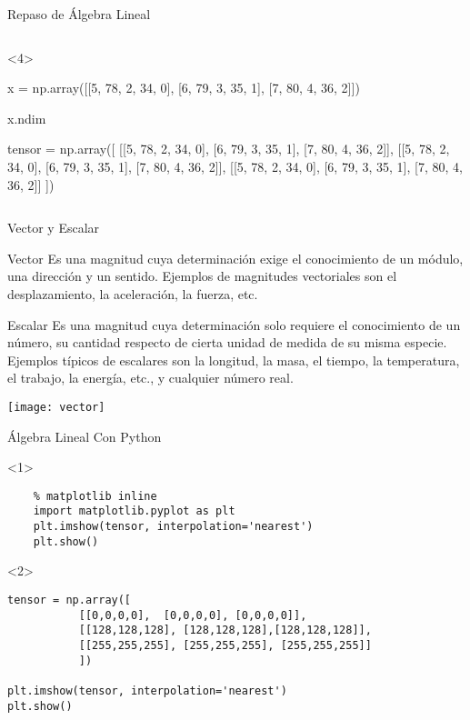 \begin{frame}[fragile]{Repaso de Álgebra Lineal}
\begin{columns}[t]
  \begin{onlyenv}<4>
    \begin{ipythonnb}
x = np.array([[5, 78, 2, 34, 0],
              [6, 79, 3, 35, 1],
              [7, 80, 4, 36, 2]])

x.ndim
\end{ipythonnb}

      \begin{ipythonnb}
        tensor = np.array([
        [[5, 78, 2, 34, 0],
         [6, 79, 3, 35, 1],
         [7, 80, 4, 36, 2]],
        [[5, 78, 2, 34, 0],
         [6, 79, 3, 35, 1],
         [7, 80, 4, 36, 2]],
        [[5, 78, 2, 34, 0],
         [6, 79, 3, 35, 1],
         [7, 80, 4, 36, 2]]
        ])
\end{ipythonnb}
\end{onlyenv}

  \end{columns}
\end{frame}

\begin{frame}{Vector y Escalar}
  \begin{block}{Vector} \justifying
    Es una magnitud cuya determinación exige el conocimiento de un módulo, una dirección y un sentido. Ejemplos de magnitudes vectoriales son el desplazamiento, la aceleración, la fuerza, etc.
  \end{block}
  \begin{block}{Escalar} \justifying
    Es una magnitud cuya determinación solo requiere el conocimiento de un número, su cantidad respecto de cierta unidad de medida de su misma especie. Ejemplos típicos de escalares son la longitud, la masa, el tiempo, la temperatura, el trabajo, la energía, etc., y cualquier número real.
  \end{block}

  {\centering
    \texttt{[image: vector]}
  \par}
\end{frame}

\begin{frame}[fragile]{Álgebra Lineal Con Python}
  \begin{onlyenv}<1>
      \begin{lstlisting}
    % matplotlib inline
    import matplotlib.pyplot as plt
    plt.imshow(tensor, interpolation='nearest')
    plt.show()
  \end{lstlisting}
\end{onlyenv}

\begin{onlyenv}<2>
  \begin{lstlisting}
tensor = np.array([
		   [[0,0,0,0],  [0,0,0,0], [0,0,0,0]],
		   [[128,128,128], [128,128,128],[128,128,128]],
		   [[255,255,255], [255,255,255], [255,255,255]]
		   ])              

plt.imshow(tensor, interpolation='nearest')
plt.show()
  \end{lstlisting}
               \end{onlyenv}

\end{frame}


